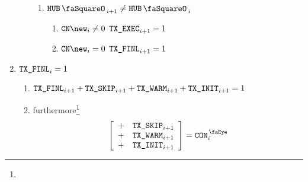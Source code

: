 \begin{enumerate}
\begin{enumerate}
\begin{enumerate}
                                        \item \If $\hubStamp _{i + 1} \neq     \hubStamp _{i}$ \Then
                                                \begin{enumerate}
                                                        \item \If $\cn\new _{i} \neq 0$ \Then $\texttt{TX}\texttt{\_EXEC} _{i + 1} = 1$
                                                        \item \If $\cn\new _{i} =    0$ \Then $\texttt{TX}\texttt{\_FINL} _{i + 1} = 1$
                                                \end{enumerate}
                                \end{enumerate}
                \end{enumerate}
        \item \If $\texttt{TX}\texttt{\_FINL} _{i} = 1$ \Then
                \begin{enumerate}
                        \item $\texttt{TX}\texttt{\_FINL} _{i + 1} + \texttt{TX}\texttt{\_SKIP} _{i + 1} + \texttt{TX}\texttt{\_WARM} _{i + 1} + \texttt{TX}\texttt{\_INIT} _{i + 1} = 1$
                        \item furthermore\footnote{}
                                \[
                                        \left[ \begin{array}{lcl}
                                                + & \txSkip _{i + 1} \\
                                                + & \txWarm _{i + 1} \\
                                                + & \txInit _{i + 1} \\
                                        \end{array} \right]
                                        = \peekContext _{i}
                                \]
                \end{enumerate}
\end{enumerate}
